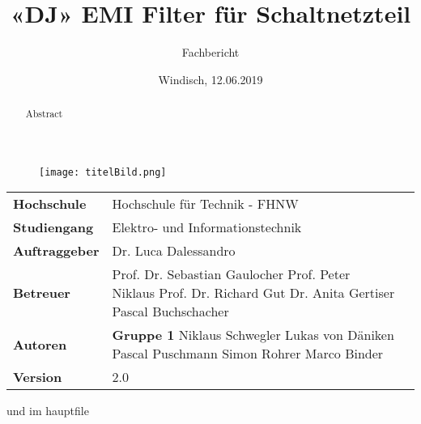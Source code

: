 \documentclass[final]{fhnwreport}       %
\title{«DJ» EMI Filter für Schaltnetzteil}          			%
\author{Fachbericht}  		%
\date{Windisch, 12.06.2019}             		%
\begin{document}
\maketitle

\vspace*{-1cm}						    %
\vfill
\begin{figure}[H]
\centering
\texttt{[image: titelBild.png]}
\end{figure}
\vfill

{
\renewcommand\arraystretch{2}
\begin{center}
\begin{tabular}{ >{\bf} l p{10cm} l }
Hochschule&Hochschule für Technik - FHNW\\
Studiengang&Elektro- und Informationstechnik\\
Auftraggeber&Dr. Luca Dalessandro\\
Betreuer&Prof. Dr. Sebastian Gaulocher \newline Prof. Peter Niklaus \newline Prof. Dr. Richard Gut \newline  Dr. Anita Gertiser \newline Pascal Buchschacher \\
Autoren&\textbf{Gruppe 1} \newline Niklaus Schwegler \newline Lukas von Däniken \newline Pascal Puschmann  \newline Simon Rohrer \newline Marco Binder\\
Version&2.0 %
\end{tabular}
\end{center}
}

\clearpage

\thispagestyle{empty}
			
\begin{abstract}
Abstract

\end{abstract}
und im hauptfile
\thispagestyle{empty}

\end{document}
